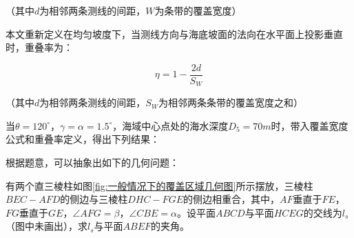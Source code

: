 （其中$d$为相邻两条测线的间距，$W$为条带的覆盖宽度）

本文重新定义在均匀坡度下，当测线方向与海底坡面的法向在水平面上投影垂直时，重叠率为：

\begin{equation}
    \eta = 1-\frac{2d}{S_W}
\end{equation}

（其中$d$为相邻两条测线的间距，$S_W$为相邻两条条带的覆盖宽度之和）

当$\theta = 120^\circ$，$\gamma=\alpha=1.5^\circ$，海域中心点处的海水深度$D_5 = 70m$时，带入覆盖宽度公式和重叠率定义，得出下列结果：

\begin{table}[h]
    \centering
    \caption{\textbf{问题1的计算结果(保留两位小数)}}
\end{table}



根据题意，可以抽象出如下的几何问题：

有两个直三棱柱如图\ref{fig:一般情况下的覆盖区域几何图}所示摆放，三棱柱$BEC-AFD$的侧边与三棱柱$DHC-FGE$的侧边相重合，其中，$AF$垂直于$FE$，$FG$垂直于$GE$，$\angle AFG=\beta$，$\angle CBE=\alpha$。设平面$ABCD$与平面$HCEG$的交线为$l_s$（图中未画出），求$l_s$与平面$ABEF$的夹角。


